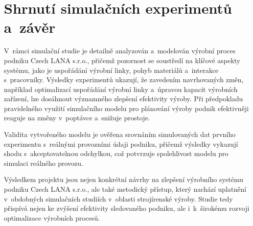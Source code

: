 \documentclass[a4paper, 11pt]{article}
\begin{document}
\section{Shrnutí simulačních experimentů a~závěr}

V~rámci simulační studie je detailně analyzován a~modelován výrobní proces podniku Czech LANA s.r.o., přičemž pozornost se soustředí na klíčové aspekty systému, jako je uspořádání výrobní linky, pohyb materiálů a~interakce s~pracovníky.
Výsledky experimentů ukazují, že zavedením navrhovaných změn, například optimalizací uspořádání výrobní linky a~úpravou kapacit výrobních zařízení, lze dosáhnout významného zlepšení efektivity výroby.
Při předpokladu pravidelného využití simulačního modelu pro plánování výroby podnik efektivněji reaguje na změny v~poptávce a~snižuje prostoje.

Validita vytvořeného modelu je ověřena srovnáním simulovaných dat prvního experimentu s~reálnými provozními údaji podniku, přičemž výsledky vykazují shodu s~akceptovatelnou odchylkou, což potvrzuje spolehlivost modelu pro simulaci reálného provozu.

Výsledkem projektu jsou nejen konkrétní návrhy na zlepšení výrobního systému podniku Czech LANA s.r.o., ale také metodický přístup, který nachází uplatnění v~obdobných simulačních studiích v~oblasti strojírenské výroby. Studie tedy přispívá nejen ke zvýšení efektivity sledovaného podniku, ale i~k~širokému rozvoji optimalizace výrobních procesů.
\end{document}
